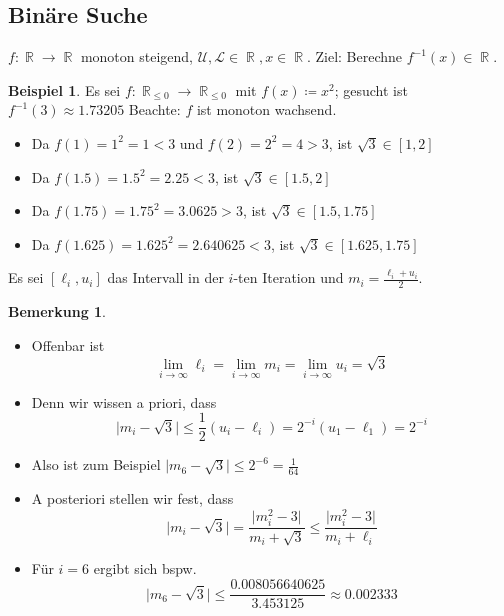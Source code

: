 \documentclass[a4paper,12pt]{article}
\DeclareMathOperator{\R}{\mathbb R}
\theoremstyle{definition}
\newtheorem*{example}{Beispiel}
\newtheorem*{bemerkung}{Bemerkung}
\begin{document}
	\subsection{Binäre Suche}
	$f: \R \to \R$ monoton steigend, $\mathcal{U}, \mathcal{L} \in \R, x \in \R$. Ziel: Berechne $f^{-1}(x) \in \R$.
	\begin{example}
		Es sei $f: \R_{\leq 0} \to \R_{\leq 0}$ mit $f(x) \coloneq x^2$; gesucht ist $f^{-1}(3) \approx 1.73205$
		Beachte: $f$ ist monoton wachsend.
		\begin{itemize}
			\item Da $f(1) = 1^2 = 1 < 3$ und $f(2) = 2^2 = 4 > 3$, ist $\sqrt{3} \in [1,2]$
			\item Da $f(1.5) = 1.5^2 = 2.25 < 3$, ist $\sqrt{3} \in [1.5,2]$
			\item Da $f(1.75) = 1.75^2 = 3.0625 > 3$, ist $\sqrt{3} \in [1.5, 1.75]$
			\item Da $f(1.625) = 1.625^2 = 2.640625 < 3$, ist $\sqrt{3} \in [1.625, 1.75]$
		\end{itemize}
		Es sei $[\ell_i, u_i]$ das Intervall in der $i$-ten Iteration und $m_i = \frac{\ell_i + u_i}{2}$.
	\end{example}
	\begin{bemerkung}
		\begin{itemize}
			\item Offenbar ist
			\[
				\lim_{i \to \infty} \ell_i = \lim_{i \to \infty} m_i = \lim_{i \to \infty} u_i = \sqrt{3}
			\]
			\item Denn wir wissen a priori, dass
			\[
				\lvert m_i - \sqrt{3} \rvert \leq \frac{1}{2}(u_i - \ell_i) = 2^{-i}(u_1 - \ell_1) = 2^{-i}
			\]
			\item Also ist zum Beispiel $\lvert m_6 - \sqrt{3} \rvert \leq 2^{-6} = \frac{1}{64}$
			\item A posteriori stellen wir fest, dass 
			\[
				\lvert m_i - \sqrt{3} \rvert = \frac{\lvert m_i^2 - 3\rvert}{m_i + \sqrt{3}} \leq \frac{\lvert m_i^2 - 3\rvert}{m_i + \ell_i}
			\]
			\item Für $i = 6$ ergibt sich bspw.
			\[
				\lvert m_6 - \sqrt{3} \rvert \leq \frac{0.008056640625}{3.453125} \approx 0.002333
			\]
		\end{itemize}
	\end{bemerkung}
\end{document}
